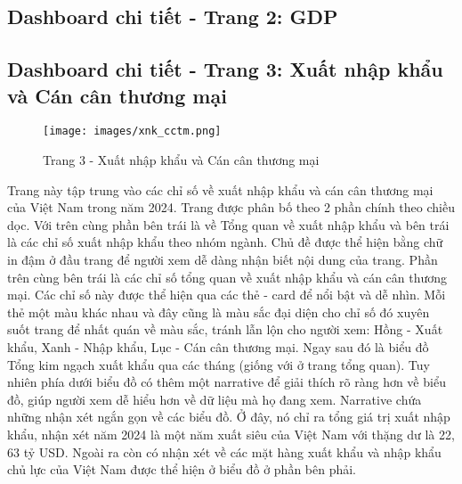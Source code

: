 \documentclass[a4paper]{report}
\begin{document}
{{\newpage
\subsection{Dashboard chi tiết - Trang 2: GDP}


\newpage
\subsection{Dashboard chi tiết - Trang 3: Xuất nhập khẩu và Cán cân thương mại}


\begin{figure}[H]
    \centering
    \texttt{[image: images/xnk\_cctm.png]}
    \caption{Trang 3 - Xuất nhập khẩu và Cán cân thương mại}
    \label{fig:enter-label}
\end{figure}

Trang này tập trung vào các chỉ số về xuất nhập khẩu và cán cân thương mại của Việt Nam trong năm 2024. Trang được phân bố theo 2 phần chính theo chiều dọc.
Với trên cùng phần bên trái là về Tổng quan về xuất nhập khẩu và bên trái là các chỉ số xuất nhập khẩu theo nhóm ngành. Chủ đề được thể hiện bằng chữ in đậm ở đầu trang để người xem dễ dàng nhận biết nội dung của trang.
Phần trên cùng bên trái là các chỉ số tổng quan về xuất nhập khẩu và cán cân thương mại. Các chỉ số này được thể hiện qua các thẻ - card để nổi bật và dễ nhìn. Mỗi thẻ một màu khác nhau và đây cũng là màu sắc đại diện cho chỉ số đó xuyên suốt trang để nhất quán về màu sắc, tránh lẫn lộn cho người xem: Hồng - Xuất khẩu, Xanh - Nhập khẩu, Lục - Cán cân thương mại.
Ngay sau đó là biểu đồ Tổng kim ngạch xuất khẩu qua các tháng (giống với ở trang tổng quan). Tuy nhiên phía dưới biểu đồ có thêm một narrative để giải thích rõ ràng hơn về biểu đồ, giúp người xem dễ hiểu hơn về dữ liệu mà họ đang xem.
Narrative chứa những nhận xét ngắn gọn về các biểu đồ. Ở đây, nó chỉ ra tổng giá trị xuất nhập khẩu, nhận xét năm 2024 là một năm xuất siêu của Việt Nam với thặng dư là 22, 63 tỷ USD. Ngoài ra còn có nhận xét về các mặt hàng xuất khẩu và nhập khẩu chủ lực của Việt Nam được thể hiện ở biểu đồ ở phần bên phải.\\

}}
\end{document}
